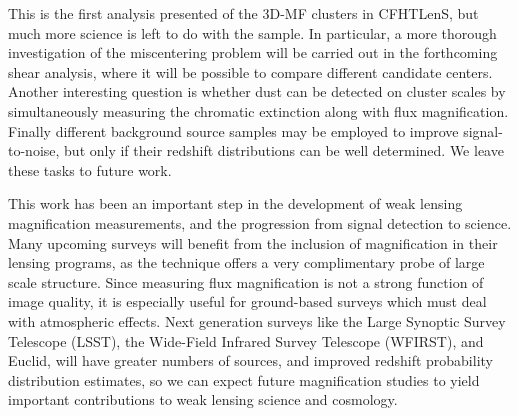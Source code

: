 This is the first analysis presented of the \ac{3D-MF} clusters in \ac{CFHTLenS}, but much more science is left to do with the sample. In particular, a more thorough investigation of the miscentering problem will be carried out in the forthcoming shear analysis, where it will be possible to compare different candidate centers. Another interesting question is whether dust can be detected on cluster scales by simultaneously measuring the chromatic extinction along with flux magnification. Finally different background source samples may be employed to improve signal-to-noise, but only if their redshift distributions can be well determined. We leave these tasks to future work.

This work has been an important step in the development of weak lensing magnification measurements, and the progression from signal detection to science. Many upcoming surveys will benefit from the inclusion of magnification in their lensing programs, as the technique offers a very complimentary probe of large scale structure. Since measuring flux magnification is not a strong function of image quality, it is especially useful for ground-based surveys which must deal with atmospheric effects. Next generation surveys like the Large Synoptic Survey Telescope (LSST), the Wide-Field Infrared Survey Telescope (WFIRST), and Euclid, will have greater numbers of sources, and improved redshift probability distribution estimates, so we can expect future magnification studies to yield important contributions to weak lensing science and cosmology.


